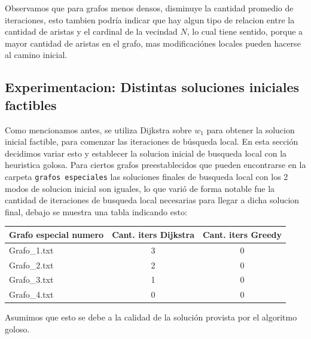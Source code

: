 Observamos que para grafos menos densos, disminuye la cantidad promedio de iteraciones, esto tambien podr\'ia indicar que hay algun tipo de relacion entre la cantidad de aristas y el cardinal de la vecindad $N$, lo cual tiene sentido, porque a mayor cantidad de aristas en el grafo, mas modificaci\'ones locales pueden hacerse al camino inicial.

\subsection{Experimentacion: Distintas soluciones iniciales factibles}
Como mencionamos antes, se utiliza Dijkstra sobre $w_1$ para obtener la solucion inicial factible, para comenzar las iteraciones de b\'usqueda local. En esta secci\'on decidimos variar esto y establecer la solucion inicial de busqueda local con la heuristica golosa. Para ciertos grafos preestablecidos que pueden encontrarse en la carpeta \texttt{grafos especiales} las soluciones finales de busqueda local con los 2 modos de solucion inicial son iguales, lo que vari\'o de forma notable fue la cantidad de iteraciones de busqueda local necesarias para llegar a dicha solucion final, debajo se muestra una tabla indicando esto:
\begin{center}
	\begin{tabular}{ | l | c | c |}
	  \hline
	  Grafo especial numero & Cant. iters Dijkstra & Cant. iters Greedy \\
	  \hline
	  Grafo\_1.txt & 3 & 0 \\
	  \hline
	  Grafo\_2.txt & 2 & 0 \\
	  \hline
	  Grafo\_3.txt & 1 & 0 \\
	  \hline
	  Grafo\_4.txt & 0 & 0 \\
	  \hline
	\end{tabular}
\end{center}

Asumimos que esto se debe a la calidad de la soluci\'on provista por el algoritmo goloso.